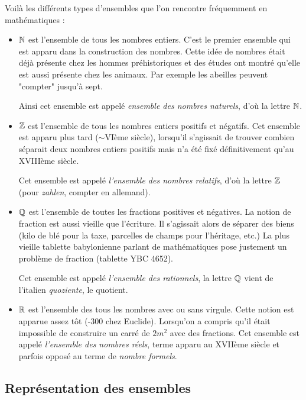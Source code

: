 Voilà les différents types d'ensembles que l'on rencontre fréquemment en mathématiques :
\begin{itemize}
\item $\mathbb{N}$ est l'ensemble de tous les nombres entiers. C'est le premier ensemble qui est apparu dans la construction des nombres. Cette idée de nombres était déjà présente chez les hommes préhistoriques et des études ont montré qu'elle est aussi présente chez les animaux. Par exemple les abeilles peuvent "compter" jusqu'à sept.

Ainsi cet ensemble est appelé \emph{ensemble des nombres naturels}, d'où la lettre $\mathbb{N}$.
\item $\mathbb{Z}$ est l'ensemble de tous les nombres entiers positifs et négatifs. Cet ensemble est apparu plus tard ($\sim$VIème siècle), lorsqu'il s'agissait de trouver combien séparait deux nombres entiers positifs mais n'a été fixé définitivement qu'au XVIIIème siècle. 

Cet ensemble est appelé \emph{l'ensemble des nombres relatifs}, d'où la lettre $\mathbb{Z}$ (pour \textit{zahlen}, compter en allemand).
\item $\mathbb{Q}$ est l'ensemble de toutes les fractions positives et négatives. La notion de fraction est aussi vieille que l'écriture. Il s'agissait alors de séparer des biens (kilo de blé pour la taxe, parcelles de champs pour l'héritage, etc.) La plus vieille tablette babylonienne parlant de mathématiques pose justement un problème de fraction (tablette YBC 4652). 

Cet ensemble est appelé \emph{l'ensemble des rationnels}, la lettre $\mathbb{Q}$ vient de l'italien \textit{quoziente}, le quotient.
\item $\mathbb{R}$ est l'ensemble des tous les nombres avec ou sans virgule. Cette notion est apparue assez tôt (-300 chez Euclide). Lorsqu'on a compris qu'il était impossible de construire un carré de $2m^2$ avec des fractions. Cet ensemble est appelé \emph{l'ensemble des nombres réels}, terme apparu au XVIIème siècle et parfois opposé au terme de \emph{nombre formels}.
\end{itemize}

\subsection{Représentation des ensembles}


